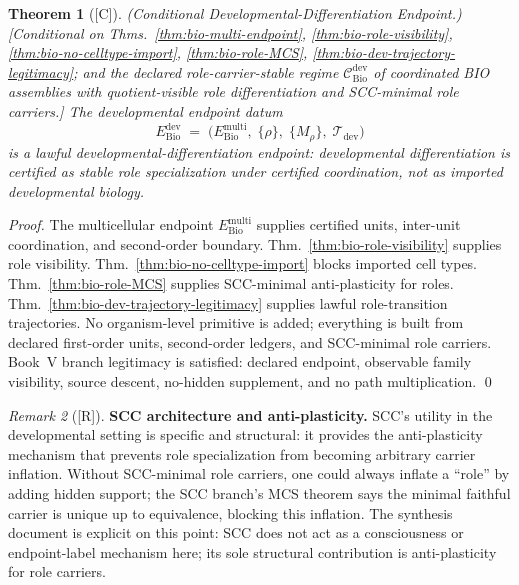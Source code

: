 \documentclass[12pt,oneside]{amsbook}
\theoremstyle{plain}
\newtheorem{theorem}{Theorem}[section]
\theoremstyle{definition}
\theoremstyle{remark}
\newtheorem{remark}[theorem]{Remark}
\newcommand{\status}[1]{\textup{[#1]}}
\begin{document}
\begin{theorem}[\status{C}]\label{thm:bio-dev-endpoint}
\textup{(Conditional Developmental-Differentiation Endpoint.)}
\textup{[Conditional on Thms.~\ref{thm:bio-multi-endpoint},
\ref{thm:bio-role-visibility}, \ref{thm:bio-no-celltype-import},
\ref{thm:bio-role-MCS}, \ref{thm:bio-dev-trajectory-legitimacy};
and the declared role-carrier-stable regime
$\mathcal{C}_{\mathrm{Bio}}^{\mathrm{dev}}$ of coordinated BIO
assemblies with quotient-visible role differentiation and SCC-minimal
role carriers.]}
The developmental endpoint datum
\[
 E_{\mathrm{Bio}}^{\mathrm{dev}} \;=\;
 \bigl(
 E_{\mathrm{Bio}}^{\mathrm{multi}},\;
 \{\rho\},\;
 \{M_\rho\},\;
 \mathcal{T}_{\mathrm{dev}}
 \bigr)
\]
is a lawful developmental-differentiation endpoint: developmental
differentiation is certified as stable role specialization under
certified coordination, not as imported developmental biology.
\end{theorem}

\begin{proof}
The multicellular endpoint $E_{\mathrm{Bio}}^{\mathrm{multi}}$
supplies certified units, inter-unit coordination, and second-order
boundary. Thm.~\ref{thm:bio-role-visibility} supplies role
visibility. Thm.~\ref{thm:bio-no-celltype-import} blocks imported
cell types. Thm.~\ref{thm:bio-role-MCS} supplies SCC-minimal
anti-plasticity for roles. Thm.~\ref{thm:bio-dev-trajectory-legitimacy}
supplies lawful role-transition trajectories. No organism-level
primitive is added; everything is built from declared first-order
units, second-order ledgers, and SCC-minimal role carriers.
Book~V branch legitimacy is satisfied: declared endpoint, observable
family visibility, source descent, no-hidden supplement, and no
path multiplication.
\qed
\end{proof}

\begin{remark}[\status{R}]\label{rem:bio-DEV-SCC-role}
\textbf{SCC architecture and anti-plasticity.}
SCC's utility in the developmental setting is specific and structural:
it provides the anti-plasticity mechanism that prevents role
specialization from becoming arbitrary carrier inflation. Without
SCC-minimal role carriers, one could always inflate a ``role'' by
adding hidden support; the SCC branch's MCS theorem says the minimal
faithful carrier is unique up to equivalence, blocking this inflation.
The synthesis document is explicit on this point: SCC does not act
as a consciousness or endpoint-label mechanism here; its sole
structural contribution is anti-plasticity for role carriers.
\end{remark}
\end{document}
